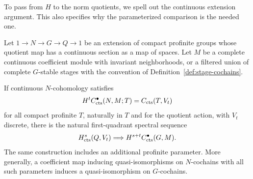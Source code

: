To pass from $H$ to the norm quotients, we spell out the
continuous extension argument.  This also specifies why
the parameterized comparison is the needed one.

\begin{lemma}
\label{lem:continuous-extension}
Let $1\to N\to G\to Q\to1$ be an extension of compact profinite groups
whose quotient map has a continuous section as a map of
spaces.  Let $M$ be a complete continuous coefficient
module with invariant neighborhoods, or a filtered union
of complete $G$-stable stages with the convention of
Definition~\ref{def:stage-cochains}.

If continuous $N$-cohomology satisfies
\[
 H^tC^\bullet_{\mathrm{cts}}(N,M;T)=C_{\mathrm{cts}}(T,V_t)
\]
for all compact profinite $T$, naturally in $T$ and for
the quotient action, with $V_t$ discrete, there is the
natural first-quadrant spectral sequence
\begin{equation}
 \label{eq:continuous-HS}
 H^s_{\mathrm{cts}}(Q,V_t)
 \Longrightarrow H^{s+t}C^\bullet_{\mathrm{cts}}(G,M).
\end{equation}
The same construction includes an additional profinite
parameter.  More generally, a coefficient map inducing
quasi-isomorphisms on $N$-cochains with all such parameters
induces a quasi-isomorphism on $G$-cochains.
\end{lemma}

